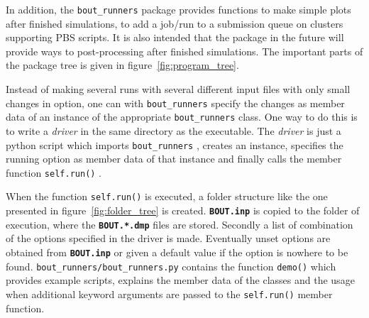 \documentclass[12pt]{article}
\newcommand{\file}[1]{\texttt{\bf #1}}
\begin{document}
In addition, the
%
\lstinline!bout_runners!
%
 package provides functions to make
simple plots after finished simulations, to add a job/run to a submission queue
on clusters supporting PBS scripts. It is also intended that the package in the
future will provide ways to post-processing after finished simulations. The
important parts of the package tree is given in figure~\ref{fig:program_tree}.


Instead of making several runs with several different input files with only
small changes in option, one can with
%
\lstinline!bout_runners!
%
 specify the
changes as member data of an instance of the appropriate
%
\lstinline!bout_runners!
%
 class. One way to do this is to write a \emph{driver}
in the same directory as the executable. The \emph{driver} is just a
python script which imports
%
\lstinline!bout_runners!
%
, creates an instance, specifies the
running option as member data of that instance and finally calls the
member function
%
\lstinline!self.run()!
%
.

When the function
%
\lstinline!self.run()!
%
 is executed, a folder structure like
the one presented in figure~\ref{fig:folder_tree} is created.
\file{BOUT.inp} is copied to the folder of execution, where the
\file{BOUT.*.dmp} files are stored. Secondly a list of combination of the
options specified in the driver is made. Eventually unset options are obtained
from \file{BOUT.inp} or given a default value if the option is nowhere to be
found.
%
\lstinline!bout_runners/bout_runners.py!
%
 contains the function
%
\lstinline!demo()!
%
 which provides example scripts, explains the member data of
the classes and the usage when additional keyword arguments are passed to the
%
\lstinline!self.run()!
%
 member function.
\end{document}
